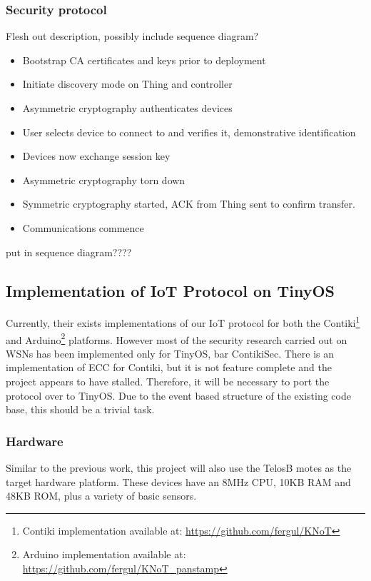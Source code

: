 \documentclass{mprop}
\begin{document}
\subsubsection{Security protocol} %
\label{ssub:security_protocol}
Flesh out description, possibly include sequence diagram?
\begin{itemize}
  \item Bootstrap CA certificates and keys prior to deployment
  \item Initiate discovery mode on Thing and controller
  \item Asymmetric cryptography authenticates devices
  \item User selects device to connect to and verifies it, demonstrative identification
  \item Devices now exchange session key
  \item Asymmetric cryptography torn down
  \item Symmetric cryptography started, ACK from Thing sent to confirm transfer.
  \item Communications commence
\end{itemize}put in sequence diagram????



\subsection{Implementation of IoT Protocol on TinyOS} %
\label{sub:implementation_of_iot_protocol_on_tinyos}
Currently, their exists implementations of our IoT protocol for both the Contiki\footnote{Contiki implementation available at: \url{https://github.com/fergul/KNoT}} and Arduino\footnote{Arduino implementation available at: \url{https://github.com/fergul/KNoT_panstamp}} platforms. However most of the security research carried out on WSNs has been implemented only for TinyOS, bar ContikiSec. There is an implementation of ECC for Contiki, but it is not feature complete and the project appears to have stalled\cite{ContikiECC}. Therefore, it will be necessary to port the protocol over to TinyOS. Due to the event based structure of the existing code base, this should be a trivial task.

\subsubsection{Hardware} %
\label{ssub:hardware}
Similar to the previous work\cite{KNoT}, this project will also use the TelosB motes as the target hardware platform. These devices have an 8MHz CPU, 10KB RAM and 48KB ROM, plus a variety of basic sensors.
\end{document}

